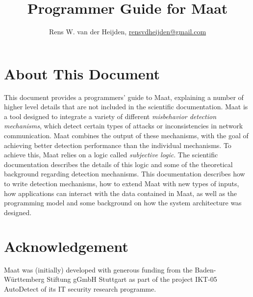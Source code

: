 \documentclass{book}%
\begin{document}
\title{Programmer Guide for Maat}

\author{Rens W. van der Heijden, \url{rensvdheijden@gmail.com} }

            
\maketitle

\chapter*{About This Document}
  This document provides a programmers' guide to Maat, explaining a number of higher level details that are not included in the scientific documentation. Maat is a tool designed to integrate a variety of different \emph{misbehavior detection mechanisms}, which detect certain types of attacks or inconsistencies in network communication. Maat combines the output of these mechanisms, with the goal of achieving better detection performance than the individual mechanisms. To achieve this, Maat relies on a logic called \emph{subjective logic}. The scientific documentation describes the details of this logic and some of the theoretical background regarding detection mechanisms. This documentation describes how to write detection mechanisms, how to extend Maat with new types of inputs, how applications can interact with the data contained in Maat, as well as the programming model and some background on how the system architecture was designed.

\tableofcontents







\chapter*{Acknowledgement}
Maat was (initially) developed with generous funding from the Baden-W\"{u}rttemberg Stiftung gGmbH Stuttgart as part of the project IKT-05 AutoDetect of its IT security research programme.




\end{document}
